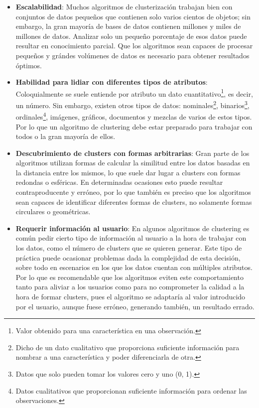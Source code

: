 \documentclass[10pt, a4paper]{article}
\begin{document}
\begin{itemize}
  \item \textbf{Escalabilidad}: Muchos algoritmos de clusterización trabajan bien con conjuntos de datos pequeños que contienen solo varios cientos de objetos; sin embargo, la gran mayoría de bases de datos contienen millones y miles de millones de datos. Analizar solo un pequeño porcentaje de esos datos puede resultar en conocimiento parcial. Que los algoritmos sean capaces de procesar pequeños y grándes volúmenes de datos es necesario para obtener resultados óptimos.
   
  \item \textbf{Habilidad para lidiar con diferentes tipos de atributos}: Coloquialmente se suele entiende por atributo un dato cuantitativo\footnote{Valor obtenido para una característica en una observación.}, es decir, un número. Sin embargo, existen otros tipos de datos: nominales\footnote{Dicho de un dato cualitativo que proporciona suficiente información para nombrar a una característica y poder diferenciarla de otra.}, binarios\footnote{Datos que solo pueden tomar los valores cero y uno (0, 1).}, ordinales\footnote{Datos cualitativos que proporcionan suficiente información para ordenar las observaciones.}, imágenes, gráficos, documentos y mezclas de varios de estos tipos. Por lo que un algoritmo de clustering debe estar preparado para trabajar con todos o la gran mayoría de ellos.
  
  \item \textbf{Descubrimiento de clusters con formas arbitrarias}: Gran parte de los algoritmos utilizan formas de calcular la similitud entre los datos basadas en la distancia entre los mismos, lo que suele dar lugar a clusters con formas redondas o esféricas. En determinadas ocasiones esto puede resultar contraproducente y erróneo, por lo que también es preciso que los algoritmos sean capaces de identificar diferentes formas de clusters, no solamente formas circulares o geométricas.
  
  \item \textbf{Requerir información al usuario}: En algunos algoritmos de clustering es común pedir cierto tipo de información al usuario a la hora de trabajar con los datos, como el número de clusters que se quieren generar. Este tipo de práctica puede ocasionar problemas dada la complejidad de esta decisión, sobre todo en escenarios en los que los datos cuentan con múltiples atributos. Por lo que es recomendable que los algoritmos eviten este comportamiento tanto para aliviar a los usuarios como para no comprometer la calidad a la hora de formar clusters, pues el algoritmo se adaptaría al valor introducido por el usuario, aunque fuese erróneo, generando también, un resultado errado.
  

\end{itemize}
\end{document}
